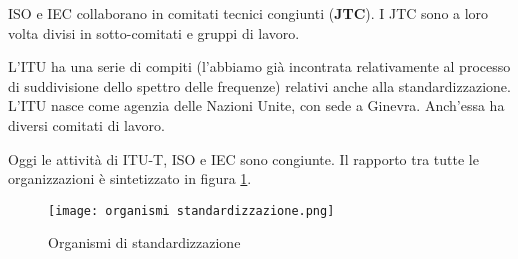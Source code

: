 ISO e IEC collaborano in comitati tecnici congiunti (\textbf{JTC}). I JTC sono a loro volta divisi in sotto-comitati e gruppi di lavoro.\bigskip

L'ITU ha una serie di compiti (l'abbiamo già incontrata relativamente al processo di suddivisione dello spettro delle frequenze) relativi anche alla standardizzazione. 
L'ITU nasce come agenzia delle Nazioni Unite, con sede a Ginevra. Anch'essa ha diversi comitati di lavoro.\bigskip

Oggi le attività di ITU-T, ISO e IEC sono congiunte.
Il rapporto tra tutte le organizzazioni è sintetizzato in figura \ref{organismi standardizzazione}.

\begin{figure}
    \centering
    \texttt{[image: organismi standardizzazione.png]}
    \caption{Organismi di standardizzazione}
    \label{organismi standardizzazione}
\end{figure}

